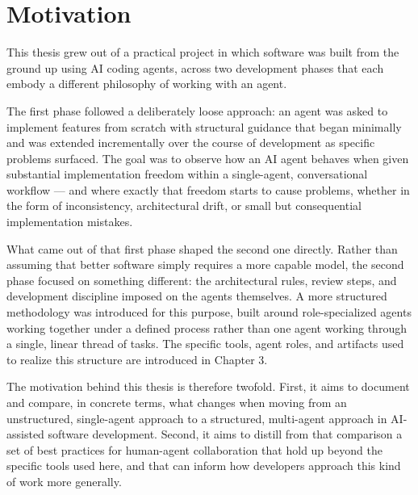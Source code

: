 \section{Motivation}

This thesis grew out of a practical project in which software was built from the ground up using AI coding agents, across two development phases that each embody a different philosophy of working with an agent.

The first phase followed a deliberately loose approach: an agent was asked to implement features from scratch with structural guidance that began minimally and was extended incrementally over the course of development as specific problems surfaced. The goal was to observe how an AI agent behaves when given substantial implementation freedom within a single-agent, conversational workflow --- and where exactly that freedom starts to cause problems, whether in the form of inconsistency, architectural drift, or small but consequential implementation mistakes.

What came out of that first phase shaped the second one directly. Rather than assuming that better software simply requires a more capable model, the second phase focused on something different: the architectural rules, review steps, and development discipline imposed on the agents themselves. A more structured methodology was introduced for this purpose, built around role-specialized agents working together under a defined process rather than one agent working through a single, linear thread of tasks. The specific tools, agent roles, and artifacts used to realize this structure are introduced in Chapter 3.

The motivation behind this thesis is therefore twofold. First, it aims to document and compare, in concrete terms, what changes when moving from an unstructured, single-agent approach to a structured, multi-agent approach in AI-assisted software development. Second, it aims to distill from that comparison a set of best practices for human-agent collaboration that hold up beyond the specific tools used here, and that can inform how developers approach this kind of work more generally.

